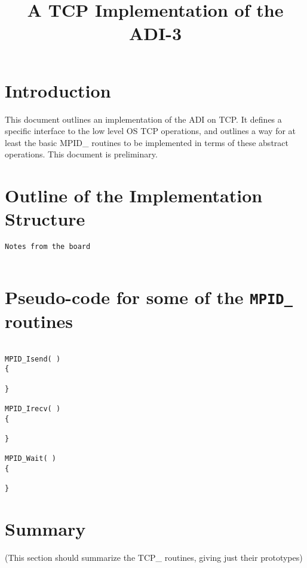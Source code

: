 \documentclass{article}
\def\code#1{\texttt{#1}}
\begin{document}
\title{A TCP Implementation of the ADI-3}
\author{}
\maketitle

\begin{abstract}

\end{abstract}

\section{Introduction}
This document outlines an implementation of the ADI on TCP.  It defines a
specific interface to the low level OS TCP operations, and outlines a way
for at least the basic MPID_ routines to be implemented in terms of these
abstract operations.  This document is preliminary.

\section{Outline of the Implementation Structure}

\begin{verbatim}
Notes from the board


\end{verbatim}

\section{Pseudo-code for some of the \code{MPID_} routines}

\begin{verbatim}

MPID_Isend( )
{

}

MPID_Irecv( )
{

}

MPID_Wait( )
{

}
\end{verbatim}

\section{Summary}
\label{sec:tcpadi-summary}
(This section should summarize the TCP\_ routines, giving just their prototypes)
\end{document}
